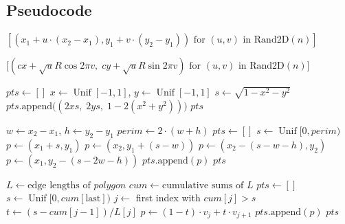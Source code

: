\subsection{Pseudocode}

\begin{algorithm}
\caption{Uniform Random Points in Basic Shapes}\label{alg:uniform_points}
\begin{algorithmic}
    \State \Return $[(x_1 + u \cdot (x_2 - x_1), y_1 + v \cdot (y_2 - y_1)) \text{ for } (u, v) \text{ in }\text{Rand2D}(n)]$
\EndFunction

\Statex

    \State \Return $\big[(cx + \sqrt{u} R \cos 2\pi v,\; cy + \sqrt{u} R \sin 2\pi v) \text{ for } (u, v) \text{ in }\text{Rand2D}(n)\big]$
\EndFunction

\Statex

    \State $pts \gets []$
        \State $x \gets \operatorname{Unif}[-1, 1]$, \quad $y \gets \operatorname{Unif}[-1, 1]$
         
            \State $s \gets \sqrt{1 - x^2 - y^2}$
            \State $pts.\text{append}\big((2xs,\; 2ys,\; 1 - 2(x^2 + y^2))\big)$
        \EndIf
    \EndWhile
    \State \Return $pts$
\EndFunction

\Statex

    \State $w \gets x_2 - x_1$, \quad $h \gets y_2 - y_1$
    \State $perim \gets 2 \cdot (w + h)$
    \State $pts \gets []$
        \State $s \gets \operatorname{Unif}[0, perim)$ 
            \State $p \gets (x_1 + s, y_1)$
            \State $p \gets (x_2, y_1 + (s - w))$
            \State $p \gets (x_2 - (s - w - h), y_2)$
        \Else
            \State $p \gets (x_1, y_2 - (s - 2w - h))$
        \EndIf
        \State $pts.\text{append}(p)$
    \EndFor
    \State \Return $pts$
\EndFunction

\Statex

    \State $L \gets \text{edge lengths of } polygon$ 
    \State $cum \gets \text{cumulative sums of } L$
    \State $pts \gets []$
        \State $s \gets \operatorname{Unif}[0, cum[\text{last}])$
        \State $j \gets$ first index with $cum[j] > s$ 
        \State $t \gets (s - cum[j-1]) / L[j]$
        \State $p \gets (1 - t) \cdot v_j + t \cdot v_{j+1}$
        \State $pts.\text{append}(p)$
    \EndFor
    \State \Return $pts$
\EndFunction
\end{algorithmic}
\end{algorithm}

